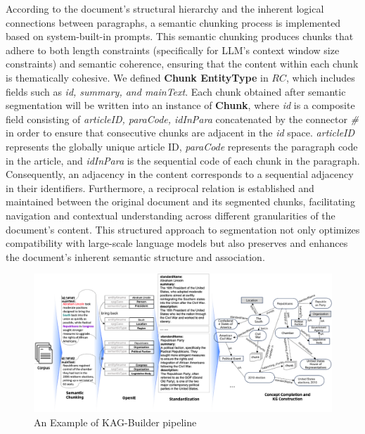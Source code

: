 \documentclass{article}
\begin{document}
According to the document's structural hierarchy and the inherent logical connections between paragraphs, a semantic chunking process is implemented based on system-built-in prompts. This semantic chunking produces chunks that adhere to both length constraints (specifically for LLM's context window size constraints) and semantic coherence, ensuring that the content within each chunk is thematically cohesive. We defined \textbf{Chunk EntityType} in $RC$, which includes fields such as \textit{id, summary, and mainText}. Each chunk obtained after semantic segmentation will be written into an instance of \textbf{Chunk}, where \textit{id} is a composite field consisting of \textit{articleID, paraCode, idInPara} concatenated by the connector \textit{\#} in order to ensure that consecutive chunks are adjacent in the \textit{id} space. \textit{articleID} represents the globally unique article ID, \textit{paraCode} represents the paragraph code in the article, and \textit{idInPara} is the sequential code of each chunk in the paragraph. Consequently, an adjacency in the content corresponds to a sequential adjacency in their identifiers. Furthermore, a reciprocal relation is established and maintained between the original document and its segmented chunks, facilitating navigation and contextual understanding across different granularities of the document's content. This structured approach to segmentation not only optimizes compatibility with large-scale language models but also preserves and enhances the document's inherent semantic structure and association.
\begin{figure}[htbp]
    \centering
    \includegraphics[width=0.9\linewidth]{figures/kag_builder_detail.png}
    \caption{An Example of KAG-Builder pipeline}
    \label{fig:kag-builder-example}
\end{figure}
\end{document}
